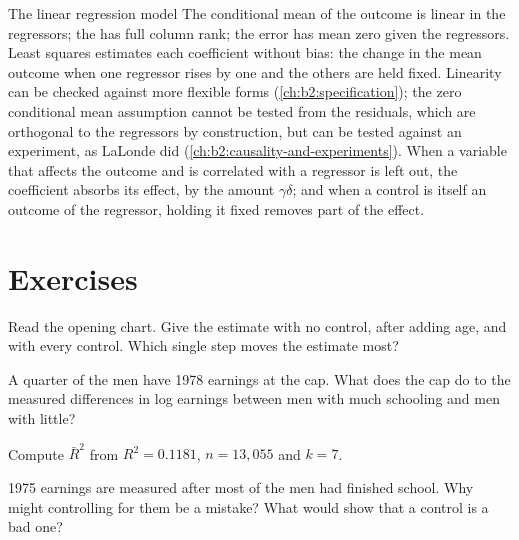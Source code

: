 \begin{model}{The linear regression model}
\assumes The conditional mean of the outcome is linear in the regressors; the  has full column rank; the
error has mean zero given the regressors.
\predicts Least squares estimates each coefficient without bias: the change in the mean outcome when one regressor rises
by one and the others are held fixed.
\tested Linearity can be checked against more flexible forms (\cref{ch:b2:specification}); the zero conditional mean
assumption cannot be tested from the residuals, which are orthogonal to the regressors by construction, but can be tested
against an experiment, as LaLonde did (\cref{ch:b2:causality-and-experiments}).
\breaks When a variable that affects the outcome and is correlated with a regressor is left out, the coefficient absorbs
its effect, by the amount $\gamma\delta$; and when a control is itself an outcome of the regressor, holding it fixed
removes part of the effect.
\end{model}

\section{Exercises}\label{sec:b2:multiple-regression:exercises}

\begin{exercise}[$\star$]\label{exo:b2:multiple-regression:1}
Read the opening chart. Give the estimate with no control, after adding age, and with every control. Which single step
moves the estimate most?
\end{exercise}

\begin{exercise}[$\star$]\label{exo:b2:multiple-regression:2}
A quarter of the men have 1978 earnings at the cap. What does the cap do to the measured differences in log earnings
between men with much schooling and men with little?
\end{exercise}

\begin{exercise}[$\star$]\label{exo:b2:multiple-regression:3}
Compute $\bar R^2$ from $R^2 = 0.1181$, $n = 13{,}055$ and $k = 7$.
\end{exercise}

\begin{exercise}[$\star$]\label{exo:b2:multiple-regression:4}
1975 earnings are measured after most of the men had finished school. Why might controlling for them be a mistake? What
would show that a control is a bad one?
\end{exercise}

